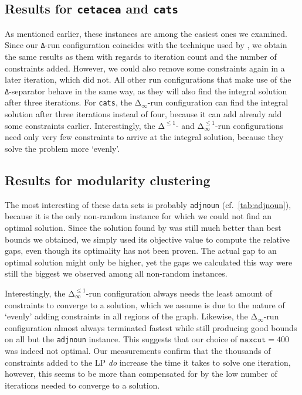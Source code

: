 \subsection{Results for \texttt{cetacea} and \texttt{cats}}
As mentioned earlier, these instances are among the easiest ones we examined.
Since our \texttt{Δ}-run configuration coincides with the technique used by \cite{grotschelCuttingPlaneAlgorithm1989}, we obtain the same results as them with regards to iteration count and the number of constraints added.
However, we could also remove some constraints again in a later iteration, which \cite{grotschelCuttingPlaneAlgorithm1989} did not.
All other run configurations that make use of the \texttt{Δ}-separator behave in the same way, as they will also find the integral solution after three iterations.
For \texttt{cats}, the $\texttt{Δ}_{\infty}$-run configuration can find the integral solution after three iterations instead of four, because it can add already add some constraints earlier.
Interestingly, the $\texttt{Δ}^{\leq 1}$- and $\texttt{Δ}_{\infty}^{\leq 1}$-run configurations need only very few constraints to arrive at the integral solution, because they solve the problem more ‘evenly’.

\subsection{Results for modularity clustering}
The most interesting of these data sets is probably \texttt{adjnoun} (cf.\ \cref{tab:adjnoun}), because it is the only non-random instance for which we could not find an optimal solution.
Since the solution found by \cite{kappesComparativeStudyModern2015} was still much better than best bounds we obtained,
we simply used its objective value to compute the relative gaps, even though its optimality has not been proven.
The actual gap to an optimal solution might only be higher, yet the gaps we calculated this way were still the biggest we observed among all non-random instances.

Interestingly, the $\texttt{Δ}_{\infty}^{\leq 1}$-run configuration always needs the least amount of constraints to converge to a solution, which we assume is due to the nature of ‘evenly’ adding constraints in all regions of the graph.
Likewise, the $\texttt{Δ}_{\infty}$-run configuration almost always terminated fastest while still producing good bounds on all but the \texttt{adjnoun} instance.
This suggests that our choice of $\texttt{maxcut} = 400$ was indeed not optimal.
Our measurements confirm that the thousands of constraints added to the LP \textit{do} increase the time it takes to solve one iteration, however, this seems to be more than compensated for by the low number of iterations needed to converge to a solution.

